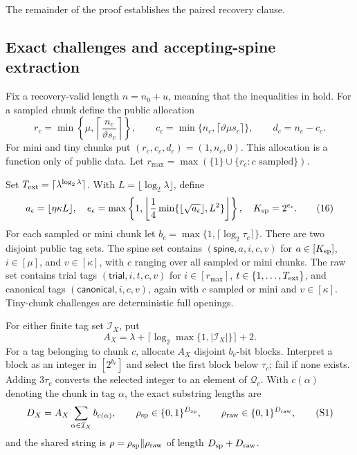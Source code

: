 \documentclass[11pt]{article}
\begin{document}
The remainder of the proof establishes the paired recovery clause.

\subsection{Exact challenges and accepting-spine extraction}

Fix a recovery-valid length $n=n_0+u$, meaning that the inequalities in
 hold.  For a sampled chunk define the public
allocation
\[
 r_c=\min\left\{\mu,
    \left\lceil\frac{n_c}{\vartheta s_c}\right\rceil\right\},\qquad
 c_c=\min\{n_c,\lceil\vartheta\mu s_c\rceil\},\qquad
 d_c=n_c-c_c.
\tag{15}\label{eq:allocation}
\]
For mini and tiny chunks put $(r_c,c_c,d_c)=(1,n_c,0)$.  This allocation is a
function only of public data.  Let
$r_{\max}=\max(\{1\}\cup\{r_c:c\text{ sampled}\})$.

Set $T_{\rm ext}=\lceil\lambda^{\log_2\lambda}\rceil$.  With
$L=\lfloor\log_2\lambda\rfloor$, define
\[
 a_\epsilon=\lfloor\eta\kappa L\rfloor,
\quad
 e_\epsilon=\max\left\{1,
 \left\lfloor\frac14\min\{\lfloor\sqrt{a_\epsilon}\rfloor,L^2\}
 \right\rfloor\right\},
\quad K_{\rm sp}=2^{e_\epsilon}.
\tag{16}\label{eq:spine-count}
\]
For each sampled or mini chunk let
$b_c=\max\{1,\lceil\log_2\tau_c\rceil\}$.  There are two disjoint public tag
sets.  The spine set contains
$(\mathsf{spine},a,i,c,v)$ for $a\in[K_{\rm sp}]$, $i\in[\mu]$, and
$v\in[\kappa]$, with $c$ ranging over all sampled or mini chunks.  The raw set contains trial tags
$(\mathsf{trial},i,t,c,v)$ for $i\in[r_{\max}]$,
$t\in\{1,\ldots,T_{\rm ext}\}$, and canonical tags
$(\mathsf{canonical},i,c,v)$, again with $c$ sampled or mini and
$v\in[\kappa]$.  Tiny-chunk
challenges are deterministic full openings.

For either finite tag set $\mathcal I_X$, put
\[
 A_X=\lambda+\lceil\log_2\max\{1,|\mathcal I_X|\}\rceil+2.
\]
For a tag belonging to chunk $c$, allocate $A_X$ disjoint $b_c$-bit blocks.
Interpret a block as an integer in $[2^{b_c}]$ and select the first block below
$\tau_c$; fail if none exists.  Adding $3\tau_c$ converts the selected integer
to an element of $\mathcal Q_c$.  With $c(\alpha)$ denoting the chunk in tag
$\alpha$, the exact substring lengths are
\[
 D_X=A_X\sum_{\alpha\in\mathcal I_X}b_{c(\alpha)},\qquad
 \rho_{\rm sp}\in\{0,1\}^{D_{\rm sp}},\qquad
 \rho_{\rm raw}\in\{0,1\}^{D_{\rm raw}},
\tag{S1}\label{eq:coin-lengths}
\]
and the shared string is
$\rho=\rho_{\rm sp}\Vert\rho_{\rm raw}$ of length
$D_{\rm sp}+D_{\rm raw}$.
\end{document}
